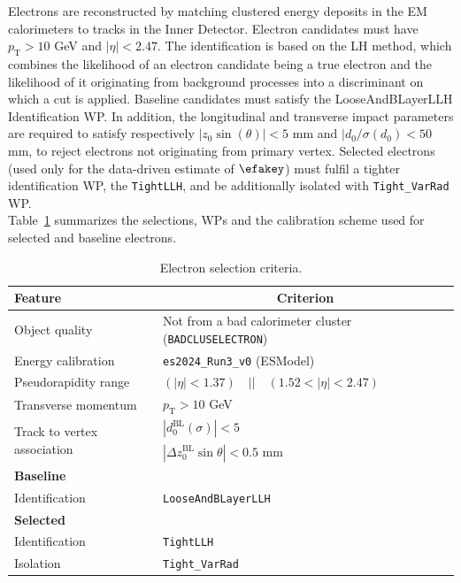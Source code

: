 Electrons are reconstructed by matching clustered energy deposits in the EM calorimeters to tracks in the
Inner Detector. Electron candidates must have $p_{\mathrm{T}}>10$ GeV and $|\eta|<2.47$. The identification is based on the LH method, which combines the likelihood of an
electron candidate being a true electron and the likelihood of it originating from background processes into a discriminant on which a cut is applied. Baseline candidates must satisfy the LooseAndBLayerLLH Identification WP. In addition, the longitudinal and transverse impact parameters are required to satisfy respectively $|z_0\sin(\theta)|<5$ mm and $|d_0/\sigma(d_0)<50$ mm, to reject electrons not originating from primary vertex.
Selected electrons (used only for the data-driven estimate of $\efakey$) must fulfil a tighter identification WP, the \texttt{TightLLH}, and be additionally isolated with \texttt{Tight\_VarRad} WP. \\
Table~\ref{tab:object:electron} summarizes the selections, WPs and the calibration scheme used for selected and baseline electrons. 


\begin{table}[ht]
  \caption{Electron selection criteria.}%
  \label{tab:object:electron}
  \centering
  \begin{tabular}{ll}
    \toprule
    Feature & \multicolumn{1}{c}{Criterion} \\
    \midrule
    Object quality & Not from a bad calorimeter cluster (\texttt{BADCLUSELECTRON})\\ 
    Energy calibration & \texttt{es2024\_Run3\_v0} (ESModel)\\
    Pseudorapidity range &  $(|\eta| < 1.37) \quad || \quad (1.52 < |\eta| < 2.47)$\\
    Transverse momentum & $p_{\mathrm{T}} >10$ GeV \\
    \multirow{2}{*}{Track to vertex association} & $|d_{0}^{\text{BL}}(\sigma)| < 5$ \\ %
    & $|\Delta z_{0}^{\text{BL}} \sin{\theta}| <0.5$ mm \\
    \midrule
    \textbf{Baseline} & \\
    \midrule
    Identification & \texttt{LooseAndBLayerLLH}\\
    \midrule
	  \textbf{Selected} & \\
    \midrule
    Identification & \texttt{TightLLH}\\
    Isolation & \texttt{Tight\_VarRad} \\
    \bottomrule
  \end{tabular}
\end{table}